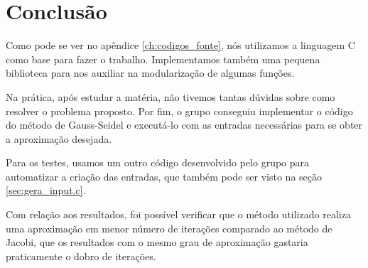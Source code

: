 \chapter*{Conclusão}
Como pode se ver no apêndice \ref{ch:codigos_fonte}, nós utilizamos a linguagem C como base para fazer o trabalho. Implementamos também uma pequena biblioteca para nos auxiliar na modularização de algumas funções.

Na prática, após estudar a matéria, não tivemos tantas dúvidas sobre como resolver o problema proposto. Por fim, o grupo conseguiu implementar o código do método de Gauss-Seidel e executá-lo com as entradas necessárias para se obter a aproximação desejada.

Para os testes, usamos um outro código desenvolvido pelo grupo para automatizar a criação das entradas, que também pode ser visto na seção \ref{sec:gera_input.c}.

Com relação aos resultados, foi possível verificar que o método utilizado realiza uma aproximação em menor número de iterações comparado ao método de Jacobi, que os resultados com o mesmo grau de aproximação gastaria praticamente o dobro de iterações.